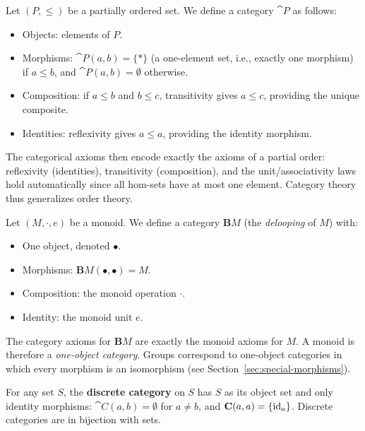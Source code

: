 \begin{example}
\label{ex:poset-category}
Let $(P, \leq)$ be a partially ordered set. We define a category $\cat{P}$ as follows:
\begin{itemize}
  \item Objects: elements of $P$.
  \item Morphisms: $\cat{P}(a,b) = \{*\}$ (a one-element set, i.e., exactly one morphism) if $a \leq b$, and $\cat{P}(a,b) = \emptyset$ otherwise.
  \item Composition: if $a \leq b$ and $b \leq c$, transitivity gives $a \leq c$, providing the unique composite.
  \item Identities: reflexivity gives $a \leq a$, providing the identity morphism.
\end{itemize}
The categorical axioms then encode exactly the axioms of a partial order: reflexivity (identities), transitivity (composition), and the unit/associativity laws hold automatically since all hom-sets have at most one element. Category theory thus generalizes order theory.
\end{example}

\begin{example}
\label{ex:monoid-category}
Let $(M, \cdot, e)$ be a monoid. We define a category $\mathbf{B}M$ (the \emph{delooping} of $M$) with:
\begin{itemize}
  \item One object, denoted $\bullet$.
  \item Morphisms: $\mathbf{B}M(\bullet, \bullet) = M$.
  \item Composition: the monoid operation $\cdot$.
  \item Identity: the monoid unit $e$.
\end{itemize}
The category axioms for $\mathbf{B}M$ are exactly the monoid axioms for $M$. A monoid is therefore a \emph{one-object category}. Groups correspond to one-object categories in which every morphism is an isomorphism (see Section~\ref{sec:special-morphisms}).
\end{example}

\begin{example}
For any set $S$, the \textbf{discrete category} on $S$ has $S$ as its object set and only identity morphisms: $\cat{C}(a,b) = \emptyset$ for $a \neq b$, and $\mathbf{C}(a,a) = \{\mathrm{id}_a\}$. Discrete categories are in bijection with sets.
\end{example}

